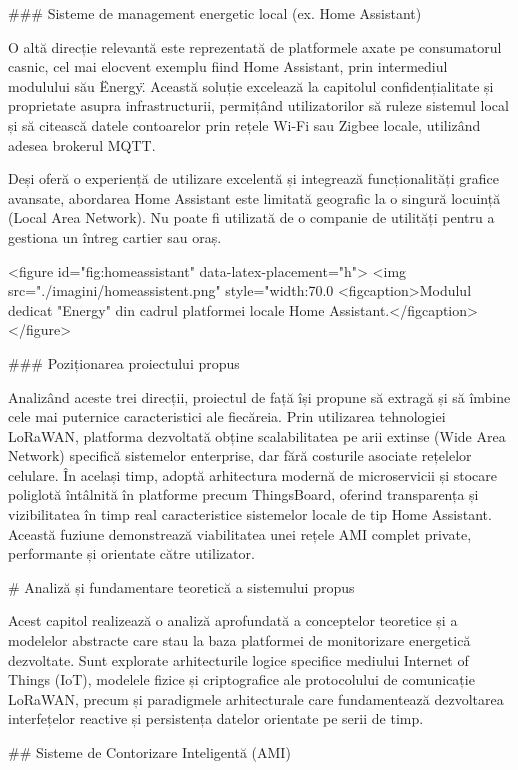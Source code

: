 ### Sisteme de management energetic local (ex. Home Assistant)

O altă direcție relevantă este reprezentată de platformele axate pe
consumatorul casnic, cel mai elocvent exemplu fiind Home Assistant, prin
intermediul modulului său \"Energy\". Această soluție excelează la
capitolul confidențialitate și proprietate asupra infrastructurii,
permițând utilizatorilor să ruleze sistemul local și să citească datele
contoarelor prin rețele Wi-Fi sau Zigbee locale, utilizând adesea
brokerul MQTT.

Deși oferă o experiență de utilizare excelentă și integrează
funcționalități grafice avansate, abordarea Home Assistant este limitată
geografic la o singură locuință (Local Area Network). Nu poate fi
utilizată de o companie de utilități pentru a gestiona un întreg cartier
sau oraș.

<figure id="fig:homeassistant" data-latex-placement="h">
<img src="./imagini/homeassistent.png" style="width:70.0%
<figcaption>Modulul dedicat "Energy" din cadrul platformei locale Home
Assistant.</figcaption>
</figure>

### Poziționarea proiectului propus

Analizând aceste trei direcții, proiectul de față își propune să extragă
și să îmbine cele mai puternice caracteristici ale fiecăreia. Prin
utilizarea tehnologiei LoRaWAN, platforma dezvoltată obține
scalabilitatea pe arii extinse (Wide Area Network) specifică sistemelor
enterprise, dar fără costurile asociate rețelelor celulare. În același
timp, adoptă arhitectura modernă de microservicii și stocare poliglotă
întâlnită în platforme precum ThingsBoard, oferind transparența și
vizibilitatea în timp real caracteristice sistemelor locale de tip Home
Assistant. Această fuziune demonstrează viabilitatea unei rețele AMI
complet private, performante și orientate către utilizator.

# Analiză și fundamentare teoretică a sistemului propus

Acest capitol realizează o analiză aprofundată a conceptelor teoretice
și a modelelor abstracte care stau la baza platformei de monitorizare
energetică dezvoltate. Sunt explorate arhitecturile logice specifice
mediului Internet of Things (IoT), modelele fizice și criptografice ale
protocolului de comunicație LoRaWAN, precum și paradigmele arhitecturale
care fundamentează dezvoltarea interfețelor reactive și persistența
datelor orientate pe serii de timp.

## Sisteme de Contorizare Inteligentă (AMI)

